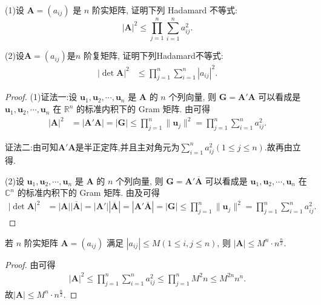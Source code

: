 \documentclass[../../main.tex]{subfiles}
\begin{document}
\begin{proposition}\label{proposition:矩阵的Hadamard不等式-例9.17}
(1)设 $\boldsymbol{A} = (a_{ij})$ 是 $n$ 阶实矩阵, 证明下列 Hadamard 不等式:
\[
|\boldsymbol{A}|^2 \leq \prod_{j = 1}^{n} \sum_{i = 1}^{n} a_{ij}^2.
\]

(2)设$\boldsymbol{A} = (a_{ij})$是$n$ 阶复矩阵, 证明下列Hadamard不等式:
\begin{align*}
|\det \boldsymbol{A}|^2 &\leq \prod_{j = 1}^{n} \sum_{i = 1}^{n} |a_{ij}|^2.
\end{align*} 
\end{proposition}
\begin{proof}
(1){\color{blue}证法一:}设 $\boldsymbol{u}_1,\boldsymbol{u}_2,\cdots,\boldsymbol{u}_n$ 是 $\boldsymbol{A}$ 的 $n$ 个列向量, 则 $\boldsymbol{G} = \boldsymbol{A}'\boldsymbol{A}$ 可以看成是 $\boldsymbol{u}_1,\boldsymbol{u}_2,\cdots,\boldsymbol{u}_n$ 在 $\mathbb{R}^n$ 的标准内积下的 Gram 矩阵. 由可得
\begin{align*}
|\boldsymbol{A}|^2 &= |\boldsymbol{A}'\boldsymbol{A}| = |\boldsymbol{G}| \leq \prod_{j = 1}^{n} \|\boldsymbol{u}_j\|^2 = \prod_{j = 1}^{n} \sum_{i = 1}^{n} a_{ij}^2.
\end{align*} 

{\color{blue}证法二:}由可知$\boldsymbol{A}'\boldsymbol{A}$是半正定阵,并且主对角元为$\sum_{i = 1}^{n} a_{ij}^2(1\leq j\leq n)$.故再由立得.


(2)设 $\boldsymbol{u}_1,\boldsymbol{u}_2,\cdots,\boldsymbol{u}_n$ 是 $\boldsymbol{A}$ 的 $n$ 个列向量, 则 $\boldsymbol{G} = \boldsymbol{A}'\overline{\boldsymbol{A}}$ 可以看成是 $\boldsymbol{u}_1,\boldsymbol{u}_2,\cdots,\boldsymbol{u}_n$ 在 $\mathbb{C}^n$ 的标准内积下的 Gram 矩阵. 由及可得
\begin{align*}
|\det \boldsymbol{A}|^2 &= \left| \boldsymbol{A} \right|\overline{\left| \boldsymbol{A} \right|}=\left| \boldsymbol{A}' \right|\left| \overline{\boldsymbol{A}} \right|= |\boldsymbol{A}'\overline{\boldsymbol{A}}| = |\boldsymbol{G}| \leq \prod_{j = 1}^{n} \|\boldsymbol{u}_j\|^2 = \prod_{j = 1}^{n} \sum_{i = 1}^{n} a_{ij}^2.
\end{align*} 
\end{proof}

\begin{corollary}\label{corollary:矩阵的Hadamard不等式的推论}
若 $n$ 阶实矩阵 $\boldsymbol{A} = (a_{ij})$ 满足 $|a_{ij}| \leq M (1 \leq i, j \leq n)$, 则 $|\boldsymbol{A}| \leq M^n \cdot n^{\frac{n}{2}}$. 
\end{corollary}
\begin{proof}
由可得
\begin{align*}
|\boldsymbol{A}|^2\leq  \prod_{j = 1}^{n} \sum_{i = 1}^{n} a_{ij}^2 \leq \prod_{j = 1}^{n}M^2n \leq  M^{2n}n^n.
\end{align*}
故$|\boldsymbol{A}| \leq M^n \cdot n^{\frac{n}{2}}$. 
\end{proof}
\end{document}
